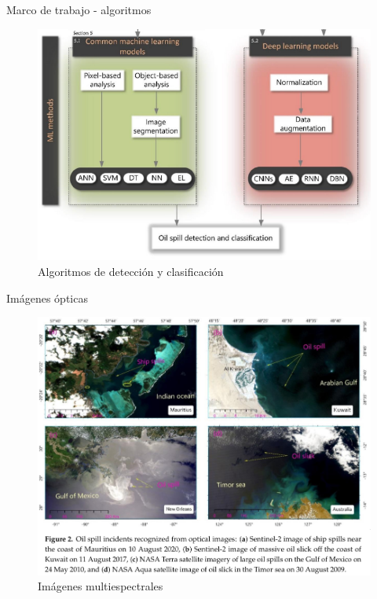 \begin{frame}{Marco de trabajo - algoritmos}
  \begin{figure}
      \centering
      \includegraphics[scale=0.6]{img/section_02/framework_spill_detection2.png}
      \caption{Algoritmos de detección y clasificación \cite{rs12203338}}
      \label{fig:my_label}
  \end{figure}
\end{frame}

\begin{frame}{Imágenes ópticas}
  \begin{figure}
      \centering
      \includegraphics[scale=1.2]{img/section_02/caracteristicas_opticas_01.png}
      \caption{Imágenes multiespectrales}
      \label{fig:optical_features_01}
  \end{figure}
\end{frame}

